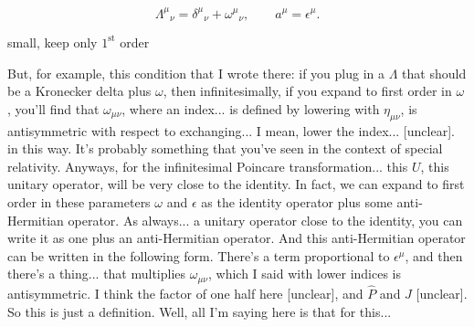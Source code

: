 \[
  \Lambda^\mu{}_{\nu}
  =\delta^\mu{}_{\nu}+\omega^\mu{}_{\nu},
  \qquad
  a^\mu=\epsilon^\mu.
\]
\begin{center}
  small, keep only \(1^{\mathrm{st}}\) order
\end{center}

\noindent
But, for example, this condition that I wrote there: if you plug in a $\Lambda$ that should be a Kronecker delta plus $\omega$, then infinitesimally, if you expand to first order in $\omega$, you'll find that $\omega_{\mu\nu}$, where an index...
is defined by lowering with $\eta_{\mu\nu}$, is antisymmetric with respect to exchanging... I mean, lower the index... [unclear].
in this way. It's probably something that you've seen in the context of special relativity. Anyways, for the infinitesimal Poincare transformation...
this $U$, this unitary operator, will be very close to the identity. In fact, we can expand to first order in these parameters $\omega$ and $\epsilon$ as the identity operator plus some anti-Hermitian operator. As always...
a unitary operator close to the identity, you can write it as one plus an anti-Hermitian operator. And this anti-Hermitian operator can be written in the following form. There's a term proportional to $\epsilon^\mu$, and then there's a thing...
that multiplies $\omega_{\mu\nu}$, which I said with lower indices is antisymmetric. I think the factor of one half here [unclear], and $\hat P$ and $\hat J$ [unclear]. So this is just a definition. Well, all I'm saying here is that for this...

